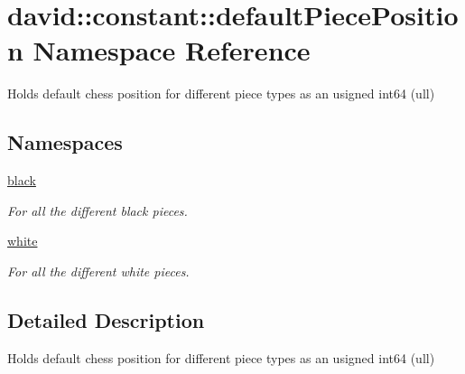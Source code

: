 \hypertarget{namespacedavid_1_1constant_1_1defaultPiecePosition}{}\section{david\+:\+:constant\+:\+:default\+Piece\+Position Namespace Reference}
\label{namespacedavid_1_1constant_1_1defaultPiecePosition}


Holds default chess position for different piece types as an usigned int64 (ull)  


\subsection*{Namespaces}
\begin{DoxyCompactItemize}
\item 
 \hyperlink{namespacedavid_1_1constant_1_1defaultPiecePosition_1_1black}{black}
\begin{DoxyCompactList}\small\item\em For all the different black pieces. \end{DoxyCompactList}\item 
 \hyperlink{namespacedavid_1_1constant_1_1defaultPiecePosition_1_1white}{white}
\begin{DoxyCompactList}\small\item\em For all the different white pieces. \end{DoxyCompactList}\end{DoxyCompactItemize}


\subsection{Detailed Description}
Holds default chess position for different piece types as an usigned int64 (ull) 